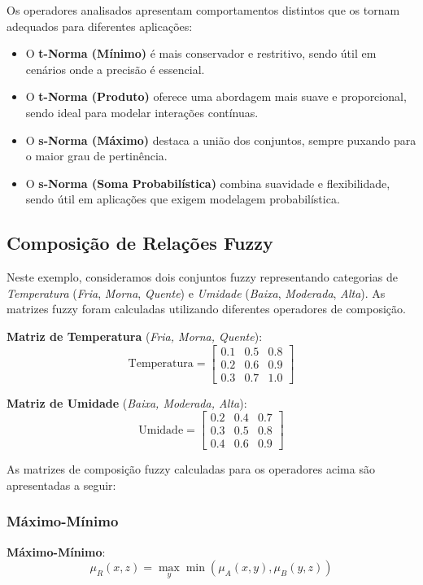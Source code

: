 \documentclass[a4paper,12pt]{article}
\begin{document}
Os operadores analisados apresentam comportamentos distintos que os tornam adequados para diferentes aplicações:

\begin{itemize}
    \item O \textbf{t-Norma (Mínimo)} é mais conservador e restritivo, sendo útil em cenários onde a precisão é essencial.
    \item O \textbf{t-Norma (Produto)} oferece uma abordagem mais suave e proporcional, sendo ideal para modelar interações contínuas.
    \item O \textbf{s-Norma (Máximo)} destaca a união dos conjuntos, sempre puxando para o maior grau de pertinência.
    \item O \textbf{s-Norma (Soma Probabilística)} combina suavidade e flexibilidade, sendo útil em aplicações que exigem modelagem probabilística.
\end{itemize}


\subsection{Composição de Relações Fuzzy}

Neste exemplo, consideramos dois conjuntos fuzzy representando categorias de \textit{Temperatura} (\textit{Fria}, \textit{Morna}, \textit{Quente}) e \textit{Umidade} (\textit{Baixa}, \textit{Moderada}, \textit{Alta}). As matrizes fuzzy foram calculadas utilizando diferentes operadores de composição.

\textbf{Matriz de Temperatura} (\textit{Fria, Morna, Quente}):
\[
\text{Temperatura} =
\begin{bmatrix}
0.1 & 0.5 & 0.8 \\
0.2 & 0.6 & 0.9 \\
0.3 & 0.7 & 1.0
\end{bmatrix}
\]

\textbf{Matriz de Umidade} (\textit{Baixa, Moderada, Alta}):
\[
\text{Umidade} =
\begin{bmatrix}
0.2 & 0.4 & 0.7 \\
0.3 & 0.5 & 0.8 \\
0.4 & 0.6 & 0.9
\end{bmatrix}
\]


As matrizes de composição fuzzy calculadas para os operadores acima são apresentadas a seguir:

\subsubsection{Máximo-Mínimo}
\textbf{Máximo-Mínimo}:
    \[
    \mu_R(x, z) = \max_y \min(\mu_A(x, y), \mu_B(y, z))
    \]
\end{document}
